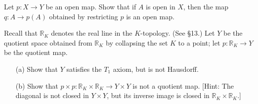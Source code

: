   \begin{exercise}[Munkres 22.5]
    Let $p : X \to Y$ be an open map. Show that if $A$ is open in $X$, then the map $q : A \to p(A)$ obtained by restricting $p$ is an open map.
  \end{exercise}

  \begin{exercise}[Munkres 22.6]
    Recall that $\mathbb{R}_K$ denotes the real line in the $K$-topology. (See \S13.) Let $Y$ be the quotient space obtained from $\mathbb{R}_K$ by collapsing the set $K$ to a point; let $p : \mathbb{R}_K \to Y$ be the quotient map.
    \begin{enumerate} 
      \item[(a)] Show that $Y$ satisfies the $T_1$ axiom, but is not Hausdorff.
      \item[(b)] Show that $p \times p : \mathbb{R}_K \times \mathbb{R}_K \to Y \times Y$ is not a quotient map. [Hint: The diagonal is not closed in $Y \times Y$, but its inverse image is closed in $\mathbb{R}_K \times \mathbb{R}_K$.]
    \end{enumerate}
  \end{exercise}

